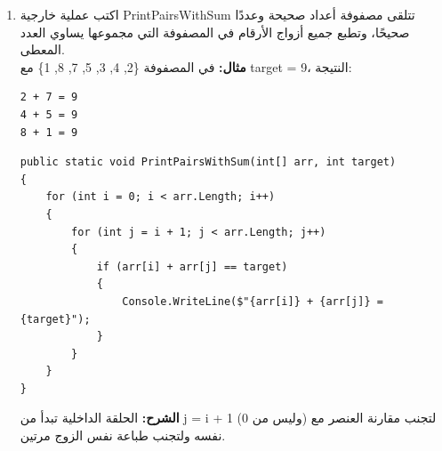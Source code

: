 \documentclass[14pt]{extarticle}
\begin{document}
\begin{enumerate}[itemsep=2em]
    \item
    اكتب عملية خارجية \textenglish{PrintPairsWithSum} تتلقى مصفوفة أعداد صحيحة وعددًا صحيحًا، وتطبع جميع أزواج الأرقام في المصفوفة التي مجموعها يساوي العدد المعطى.\\
    \textbf{مثال:} في المصفوفة \textenglish{\{2, 4, 3, 5, 7, 8, 1\}} مع \textenglish{target = 9}، النتيجة:
    \begin{english}
        \begin{boxCode}
    \begin{verbatim}
2 + 7 = 9
4 + 5 = 9
8 + 1 = 9
    \end{verbatim}
\end{boxCode}
    \end{english}
    \ifwithsols
    \begin{boxSolution}
    \begin{english}
    \begin{verbatim}
public static void PrintPairsWithSum(int[] arr, int target)
{
    for (int i = 0; i < arr.Length; i++)
    {
        for (int j = i + 1; j < arr.Length; j++)
        {
            if (arr[i] + arr[j] == target)
            {
                Console.WriteLine($"{arr[i]} + {arr[j]} = {target}");
            }
        }
    }
}
    \end{verbatim}
    \end{english}
    \textbf{الشرح:} الحلقة الداخلية تبدأ من \textenglish{j = i + 1} (وليس من 0) لتجنب مقارنة العنصر مع نفسه ولتجنب طباعة نفس الزوج مرتين.
    \end{boxSolution}
    \fi


\end{enumerate}
\end{document}

